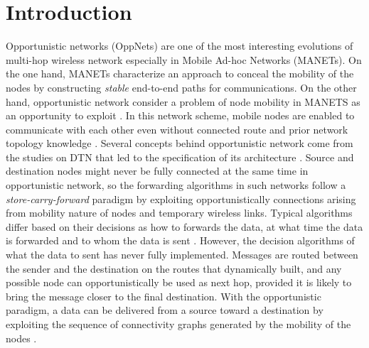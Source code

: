 \chapter{Introduction}
\label{intro}

Opportunistic networks (OppNets) are one of the most interesting evolutions of multi-hop wireless network especially in Mobile Ad-hoc Networks (MANETs).
On the one hand, MANETs characterize an approach to conceal the mobility of the nodes by constructing \emph{stable} end-to-end paths for communications. 
On the other hand, opportunistic network consider a problem of node mobility in MANETS as an opportunity to exploit \cite{Conti2014}.
In this network scheme, mobile nodes are enabled to communicate with each other even without connected route and prior network topology knowledge \cite{Pelusi2006}.
Several concepts behind opportunistic network come from the studies on DTN that led to the specification of its architecture \cite{Conan2008,Yu2012,Rongxing2010,Schurgot2012}. 
Source and destination nodes might never be fully connected at the same time in opportunistic network, so the forwarding algorithms in such networks follow a \emph{store-carry-forward} paradigm \cite{Yamamura2011,Jie2007,Jie2007a} by exploiting opportunistically connections arising from mobility nature of nodes and temporary wireless links. 
Typical algorithms differ based on their decisions as how to forwards the data, at what time the data is forwarded and to whom the data is sent \cite{Joe2010}. 
However, the decision algorithms of what the data to sent has never fully implemented. 
Messages are routed between the sender and the destination on the routes that dynamically built, and any possible node can opportunistically be used as next hop, provided it is likely to bring the message closer to the final destination.
With the opportunistic paradigm, a data can be delivered from a source toward a destination by exploiting the sequence of connectivity graphs generated by the mobility of the nodes \cite{Acer20111,Ferretti2013}.

